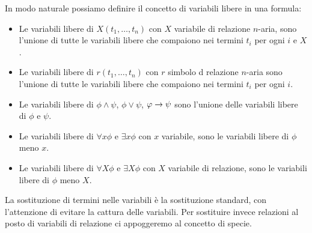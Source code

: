 \documentclass[]{marticle}
\begin{document}
In modo naturale possiamo definire il concetto di variabili libere in una
formula:
\begin{block}[Definizione]
    \begin{itemize} 
        \item Le variabili libere di $X(t_1, \dots, t_n)$ con $X$ variabile di
            relazione $n$-aria, sono l'unione di tutte le variabili libere che
            compaiono nei termini $t_i$ per ogni $i$ e $X$.
        \item Le variabili libere di $r(t_1, \dots, t_n)$ con $r$ simbolo d
            relazione $n$-aria sono l'unione di tutte le variabili libere che
            compaiono nei termini $t_i$ per ogni $i$.
        \item Le variabili libere di $\phi \land \psi$, $\phi \lor \psi$, $\varphi
            \rightarrow \psi$ sono l'unione delle variabili libere di $\phi$ e $\psi$.
        \item Le variabili libere di $\forall x \phi$ e $\exists x \phi$ con $x$
            variabile, sono le variabili libere di $\phi$ meno $x$.
        \item Le variabili libere di $\forall X \phi$ e $\exists X \phi$ con $X$
            variabile di relazione, sono le variabili libere di $\phi$ meno $X$.
    \end{itemize} 
\end{block}

La sostituzione di termini nelle variabili \`e la sostituzione standard, con
l'attenzione di evitare la cattura delle variabili. Per sostituire invece
relazioni al posto di variabili di relazione ci appoggeremo al concetto di
specie.
\end{document}
